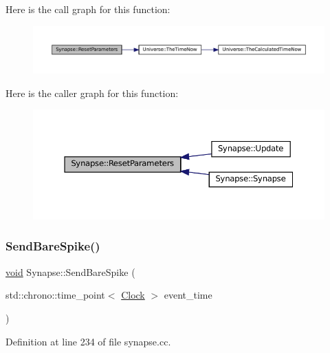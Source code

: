 Here is the call graph for this function\+:\nopagebreak
\begin{figure}[H]
\begin{center}
\leavevmode
\includegraphics[width=350pt]{class_synapse_a5b2bbc3553e92492a5c38d1d797fcd92_cgraph}
\end{center}
\end{figure}
Here is the caller graph for this function\+:\nopagebreak
\begin{figure}[H]
\begin{center}
\leavevmode
\includegraphics[width=350pt]{class_synapse_a5b2bbc3553e92492a5c38d1d797fcd92_icgraph}
\end{center}
\end{figure}
\mbox{\label{class_synapse_a0e28e56ecea170443fdd9722622da6b9}} 
\subsubsection{\texorpdfstring{Send\+Bare\+Spike()}{SendBareSpike()}}
{\footnotesize\ttfamily \mbox{\hyperlink{glad_8h_a950fc91edb4504f62f1c577bf4727c29}{void}} Synapse\+::\+Send\+Bare\+Spike (\begin{DoxyParamCaption}\item[{std\+::chrono\+::time\+\_\+point$<$ \mbox{\hyperlink{universe_8h_a0ef8d951d1ca5ab3cfaf7ab4c7a6fd80}{Clock}} $>$}]{event\+\_\+time }\end{DoxyParamCaption})}



Definition at line 234 of file synapse.\+cc.

